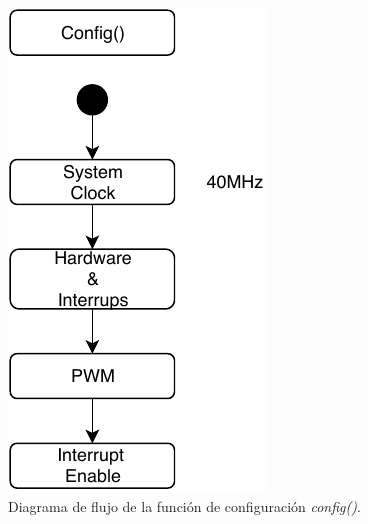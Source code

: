 \documentclass[conference]{IEEEtran}
\begin{document}
\begin{figure}[h]
    \centering
    \includegraphics[width=0.55\linewidth]{photos/config.pdf}
    \caption{\large{Diagrama de flujo de la función de configuración \textit{config()}.}}
    \label{fig:config}
\end{figure}
\end{document}
